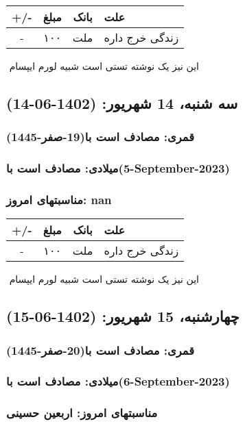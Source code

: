 \documentclass{article}
\newcommand{\rnote}[1]{\marginpar{\textcolor{color}{\StrSubstitute{\##1}{ }{\_}}}}
\newcommand{\myRow}[4]{
    #1 & #2 & #3 & #4 \\ \hline
}
\begin{document}
\begin{tabular}{ | c | c | c | p{5cm} |}
    \hline
    \myRow{ +/- }{مبلغ}{بانک}{علت}
    \myRow{-}{۱۰۰}{ملت}{زندگی خرج داره}
\end{tabular}
\newline
\newline

‌
\rnote{تست}
این نیز یک نوشته تستی است شبیه لورم ایپسام




\newpage
{}
\textcolor{color}{
\section{ سه شنبه، 14 شهریور: (1402-06-14) }
\subsubsection*{قمری: مصادف است با(19-صفر-1445)} 
\subsubsection*{میلادی: مصادف است با(5-September-2023)}
\subsubsection*{مناسبتهای امروز: nan}
}


\begin{tabular}{ | c | c | c | p{5cm} |}
    \hline
    \myRow{ +/- }{مبلغ}{بانک}{علت}
    \myRow{-}{۱۰۰}{ملت}{زندگی خرج داره}
\end{tabular}
\newline
\newline

‌
\rnote{تست}
این نیز یک نوشته تستی است شبیه لورم ایپسام




\newpage
{}
\textcolor{color}{
\section{ چهارشنبه، 15 شهریور: (1402-06-15) }
\subsubsection*{قمری: مصادف است با(20-صفر-1445)} 
\subsubsection*{میلادی: مصادف است با(6-September-2023)}
\subsubsection*{مناسبتهای امروز: اربعین حسینی}
}
\end{document}
